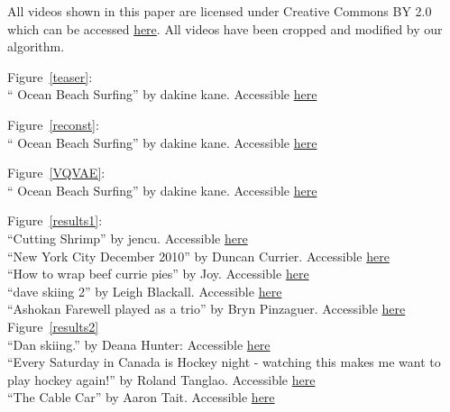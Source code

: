 \documentclass{article}
\begin{document}
All videos shown in this paper are licensed under Creative Commons BY 2.0 which can be accessed \href{https://creativecommons.org/licenses/by/2.0/}{here}. All videos have been cropped and modified by our algorithm.

Figure~\ref{teaser}: \\
“ Ocean Beach Surfing” by dakine kane.
Accessible \href{https://www.flickr.com/photos/61112791@N00/8361264621}{here}

Figure~\ref{reconst}: \\
“ Ocean Beach Surfing” by dakine kane.
Accessible \href{https://www.flickr.com/photos/61112791@N00/8361264621}{here}

Figure~\ref{VQVAE}: \\
“ Ocean Beach Surfing” by dakine kane.
Accessible \href{https://www.flickr.com/photos/61112791@N00/8361264621}{here}

Figure~\ref{results1}: \\
“Cutting Shrimp” by jencu.
Accessible \href{https://www.flickr.com/photos/10581108@N00/3767578041}{here} \\
“New York City December 2010” by Duncan Currier.
Accessible \href{https://www.flickr.com/photos/26844488@N07/5297091231}{here} \\
“How to wrap beef currie pies” by Joy.
Accessible \href{https://www.flickr.com/photos/33993074@N00/3120549283}{here} \\
“dave skiing 2” by Leigh Blackall.
Accessible \href{https://www.flickr.com/photos/97283472@N00/3072947082}{here} \\
“Ashokan Farewell played as a trio” by Bryn Pinzaguer.
Accessible \href{https://www.flickr.com/photos/12394349@N06/4181870078}{here} \\

Figure~\ref{results2} \\
“Dan skiing.” by Deana Hunter:
Accessible \href{https://www.flickr.com/photos/87013411@N00/3893217499}{here} \\
“Every Saturday in Canada is Hockey night - watching this makes me want to play hockey
again!” by Roland Tanglao.
Accessible \href{https://www.flickr.com/photos/35034347371@N01/4448745439}{here} \\
“The Cable Car” by Aaron Tait.
Accessible \href{https://www.flickr.com/photos/96272984@N00/2442344223}{here} \\

 

\small
\printbibliography
\end{document}
